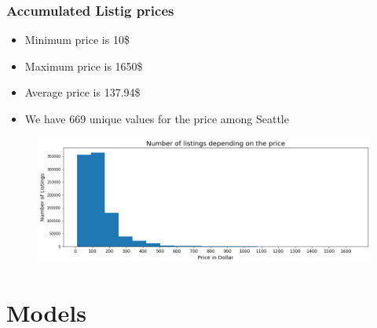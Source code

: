 \documentclass{beamer}
\begin{document}

\begin{frame}
\frametitle{Accumulated Listig prices}
\begin{itemize}
\item Minimum price is 10\$
\item Maximum price is 1650\$
\item Average price is 137.94\$
\item We have 669 unique values for the price among Seattle
\end{itemize}
\begin{figure}
\includegraphics[width=0.8\linewidth]{photo/1_number_of_listings_depending_on_price}
\end{figure}
\end{frame}


\section{Models}

\end{document}

